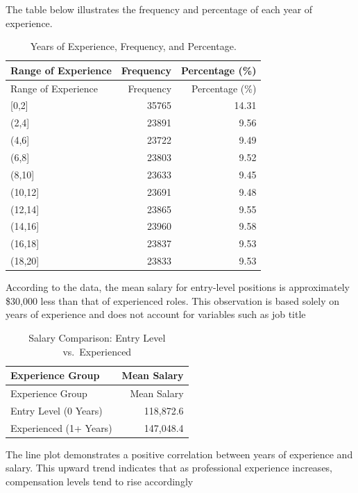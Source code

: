 \documentclass[
]{article}
\begin{document}
\newpage

The table below illustrates the frequency and percentage of each year of
experience.

\begin{longtable}[]{@{}lrr@{}}
\caption{Years of Experience, Frequency, and Percentage.}\tabularnewline
\toprule\noalign{}
Range of Experience & Frequency & Percentage (\%) \\
\midrule\noalign{}
\endfirsthead
\toprule\noalign{}
Range of Experience & Frequency & Percentage (\%) \\
\midrule\noalign{}
\endhead
\bottomrule\noalign{}
\endlastfoot
{[}0,2{]} & 35765 & 14.31 \\
(2,4{]} & 23891 & 9.56 \\
(4,6{]} & 23722 & 9.49 \\
(6,8{]} & 23803 & 9.52 \\
(8,10{]} & 23633 & 9.45 \\
(10,12{]} & 23691 & 9.48 \\
(12,14{]} & 23865 & 9.55 \\
(14,16{]} & 23960 & 9.58 \\
(16,18{]} & 23837 & 9.53 \\
(18,20{]} & 23833 & 9.53 \\
\end{longtable}

According to the data, the mean salary for entry-level positions is
approximately \$30,000 less than that of experienced roles. This
observation is based solely on years of experience and does not account
for variables such as job title

\begin{longtable}[]{@{}lr@{}}
\caption{Salary Comparison: Entry Level vs.~Experienced}\tabularnewline
\toprule\noalign{}
Experience Group & Mean Salary \\
\midrule\noalign{}
\endfirsthead
\toprule\noalign{}
Experience Group & Mean Salary \\
\midrule\noalign{}
\endhead
\bottomrule\noalign{}
\endlastfoot
Entry Level (0 Years) & 118,872.6 \\
Experienced (1+ Years) & 147,048.4 \\
\end{longtable}

The line plot demonstrates a positive correlation between years of
experience and salary. This upward trend indicates that as professional
experience increases, compensation levels tend to rise accordingly
\end{document}
